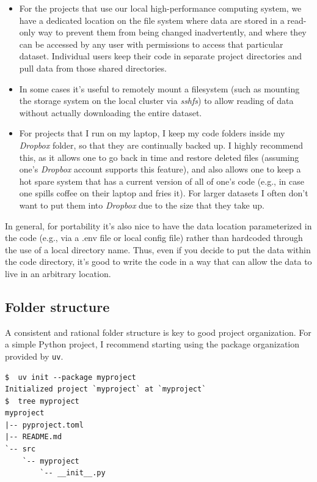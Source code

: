 \begin{itemize}
\item For the projects that use our local high-performance computing system, we have a dedicated location on the file system where data are stored in a read-only way to prevent them from being changed inadvertently, and where they can be accessed by any user with permissions to access that particular dataset.  Individual users keep their code in separate project directories and pull data from those shared directories.
\item In some cases it's useful to remotely mount a filesystem (such as mounting the storage system on the local cluster via \textit{sshfs}) to allow reading of data without actually downloading the entire dataset.
\item For projects that I run on my laptop, I keep my code folders inside my \textit{Dropbox} folder, so that they are continually backed up.  I highly recommend this, as it allows one to go back in time and restore deleted files (assuming one's \textit{Dropbox} account supports this feature), and also allows one to keep a hot spare system that has a current version of all of one's code (e.g., in case one spills coffee on their laptop and fries it).  For larger datasets I often don't want to put them into \textit{Dropbox} due to the size that they take up.
\end{itemize}

In general, for portability it's also nice to have the data location parameterized in the code (e.g., via a .env file or local config file) rather than hardcoded through the use of a local directory name.  Thus, even if you decide to put the data within the code directory, it's good to write the code in a way that can allow the data to live in an arbitrary location.

\subsection{Folder structure}

A consistent and rational folder structure is key to good project organization.  For a simple Python project, I recommend starting using the package organization provided by \texttt{uv}.

\begin{lstlisting}[style=shell]
$  uv init --package myproject
Initialized project `myproject` at `myproject`
$  tree myproject
myproject
|-- pyproject.toml
|-- README.md
`-- src
    `-- myproject
        `-- __init__.py
\end{lstlisting}


